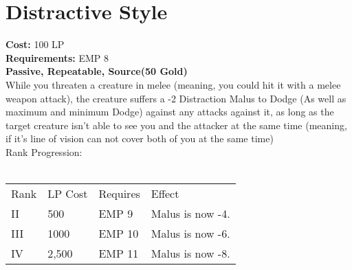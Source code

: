 \section{Distractive Style}\label{perk:distractiveStyle}
\textbf{Cost:} 100 LP\\
\textbf{Requirements:} EMP 8\\
\textbf{Passive, Repeatable, Source(50 Gold)}\\
While you threaten a creature in melee (meaning, you could hit it with a melee weapon attack), the creature suffers a -2 Distraction Malus to Dodge (As well as maximum and minimum Dodge) against any attacks against it, as long as the target creature isn't able to see you and the attacker at the same time (meaning, if it's line of vision can not cover both of you at the same time)\\
Rank Progression:\\
\\
\begin{tabular}{l | l | l | l}
    Rank & LP Cost & Requires & Effect\\
    II & 500 & EMP 9 & Malus is now -4.\\
    III & 1000 & EMP 10 &  Malus is now -6.\\
    IV & 2,500 & EMP 11 &  Malus is now -8.\\
\end{tabular}